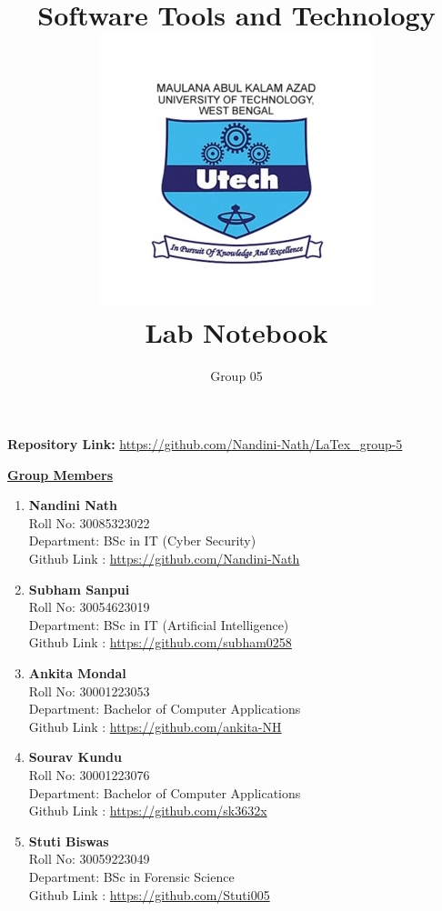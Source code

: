 \documentclass[12pt, a4paper]{article}
\title{
    \vspace{-2.5cm}
    \Huge \textbf{\color{black!60} Software Tools and Technology}\\[0.5cm]
    \includegraphics[width=0.3\linewidth]{Makaut.png}\\[0.2cm]
    \LARGE \textbf{\color{black} Lab Notebook}
}
\author{
    \vspace{1.3cm}
    \Large Group 05
}
\date{} %
\begin{document}
\maketitle
{}


\vspace{-2cm}
\begin{center}
\textbf{Repository Link:} \href{https://github.com/Nandini-Nath/LaTex_group-5}{\textcolor{blue!60}{https://github.com/Nandini-Nath/LaTex\_group-5}}
\end{center}

\vspace{0.5cm}

\centering
\bfseries{\underline{\Large \textcolor{blue!60}{Group Members}}}
\vspace{0.4cm}

\begin{flushleft}
\begin{enumerate}
    \item \textbf{Nandini Nath} \\
    Roll No: 30085323022 \\
    Department: BSc in IT (Cyber Security)\\
    Github Link : \url{https://github.com/Nandini-Nath}
    \item \textbf{Subham Sanpui} \\
    Roll No: 30054623019 \\
    Department: BSc in IT (Artificial Intelligence)\\
    Github Link : \url{https://github.com/subham0258}
    \item \textbf{Ankita Mondal} \\
    Roll No: 30001223053 \\
    Department: Bachelor of Computer Applications\\
    Github Link : \url{https://github.com/ankita-NH}
    \item \textbf{Sourav Kundu} \\
    Roll No: 30001223076 \\
    Department: Bachelor of Computer Applications\\
    Github Link : \url{https://github.com/sk3632x}
    \item \textbf{Stuti Biswas} \\
    Roll No: 30059223049 \\
    Department: BSc in Forensic Science \\
    Github Link : \url {https://github.com/Stuti005}
\end{enumerate}
\end{flushleft}
\end{document}
